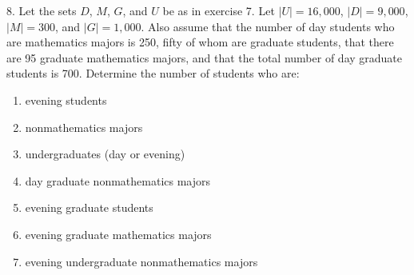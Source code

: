 \documentclass[10pt,]{book}
\theoremstyle{plain}
\theoremstyle{definition}
\begin{document}
\begin{exercisegroup}
\par\smallskip
\item[8.]\hypertarget{exercise-14}{} Let the sets \( D\), \( M\), \( G\), and \( U\) be as in exercise 7.  Let \(\lvert U \rvert  = 16,000\), \(\lvert D \rvert = 9,000\), \(|M |=
300\), and \(\lvert G \rvert = 1,000\). Also assume that the number of day students who are mathematics majors is 250, fifty of whom are graduate students, that there are 95 graduate mathematics majors, and that the total number of day graduate students is 700. Determine the number of students who are: 
\leavevmode%
\begin{multicols}{1}
\begin{enumerate}[label=(\alph*)]
\item\hypertarget{li-104}{}  evening students \item\hypertarget{li-105}{}  nonmathematics majors \item\hypertarget{li-106}{}  undergraduates (day or evening) \item\hypertarget{li-107}{}  day graduate nonmathematics majors \item\hypertarget{li-108}{}  evening graduate students \item\hypertarget{li-109}{}  evening graduate mathematics majors \item\hypertarget{li-110}{}  evening undergraduate nonmathematics majors \end{enumerate}
\end{multicols}
\par\smallskip
\end{exercisegroup}
\par\smallskip\noindent
\typeout{************************************************}
\typeout{************************************************}
\end{document}
